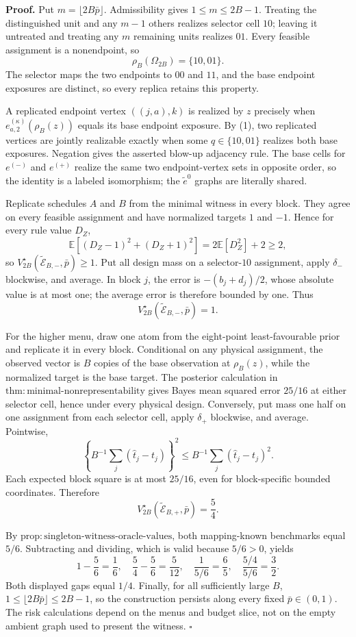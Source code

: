 \textbf{Proof.}
Put \(m=\lfloor2B\bar p\rfloor\). Admissibility gives \(1\le m\le2B-1\). Treating the distinguished unit and any \(m-1\) others realizes selector cell \(10\); leaving it untreated and treating any \(m\) remaining units realizes \(01\). Every feasible assignment is a nonendpoint, so
\[
 \rho_B(\Omega_{2B})=\{10,01\}. \tag{1}
\]
The selector maps the two endpoints to \(00\) and \(11\), and the base endpoint exposures are distinct, so every replica retains this property.

A replicated endpoint vertex \(((j,a),k)\) is realized by \(z\) precisely when \(e^{(\kappa)}_{a,2}(\rho_B(z))\) equals its base endpoint exposure. By (1), two replicated vertices are jointly realizable exactly when some \(q\in\{10,01\}\) realizes both base exposures. Negation gives the asserted blow-up adjacency rule. The base cells for \(e^{(-)}\) and \(e^{(+)}\) realize the same two endpoint-vertex sets in opposite order, so the identity is a labeled isomorphism; the \(\widetilde e^0\) graphs are literally shared.

Replicate schedules \(A\) and \(B\) from the minimal witness in every block. They agree on every feasible assignment and have normalized targets \(1\) and \(-1\). Hence for every rule value \(D_Z\),
\[
 \mathbb E[(D_Z-1)^2+(D_Z+1)^2]=2\mathbb E[D_Z^2]+2\ge2,
\]
so \(V_{2B}^\star(\widetilde{\mathcal E}_{B,-},\bar p)\ge1\). Put all design mass on a selector-\(10\) assignment, apply \(\delta_-\) blockwise, and average. In block \(j\), the error is \(-(b_j+d_j)/2\), whose absolute value is at most one; the average error is therefore bounded by one. Thus
\[
 V_{2B}^\star(\widetilde{\mathcal E}_{B,-},\bar p)=1. \tag{2}
\]

For the higher menu, draw one atom from the eight-point least-favourable prior and replicate it in every block. Conditional on any physical assignment, the observed vector is \(B\) copies of the base observation at \(\rho_B(z)\), while the normalized target is the base target. The posterior calculation in \(\mathrm{thm{:}minimal\text{-}nonrepresentability}\) gives Bayes mean squared error \(25/16\) at either selector cell, hence under every physical design. Conversely, put mass one half on one assignment from each selector cell, apply \(\delta_+\) blockwise, and average. Pointwise,
\[
 \left\{B^{-1}\sum_j(\widehat t_j-t_j)\right\}^2
 \le B^{-1}\sum_j(\widehat t_j-t_j)^2.
\]
Each expected block square is at most \(25/16\), even for block-specific bounded coordinates. Therefore
\[
 V_{2B}^\star(\widetilde{\mathcal E}_{B,+},\bar p)=\frac54. \tag{3}
\]

By \(\mathrm{prop{:}singleton\text{-}witness\text{-}oracle\text{-}values}\), both mapping-known benchmarks equal \(5/6\). Subtracting and dividing, which is valid because \(5/6>0\), yields
\[
 1-\frac56=\frac16,
 \quad \frac54-\frac56=\frac5{12},
 \quad \frac1{5/6}=\frac65,
 \quad \frac{5/4}{5/6}=\frac32.
\]
Both displayed gaps equal \(1/4\). Finally, for all sufficiently large \(B\), \(1\le\lfloor2B\bar p\rfloor\le2B-1\), so the construction persists along every fixed \(\bar p\in(0,1)\). The risk calculations depend on the menus and budget slice, not on the empty ambient graph used to present the witness. \(\square\)